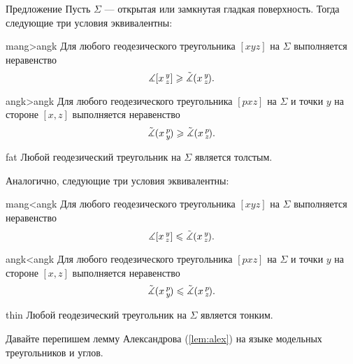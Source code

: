 \begin{thm}{Предложение}\label{prop:comp-reformulations}
Пусть $\Sigma$ --- открытая или замкнутая гладкая поверхность.
Тогда следующие три условия эквивалентны:

\begin{subthm}{mang>angk}
Для любого геодезического треугольника $[xyz]$ на $\Sigma$ выполняется неравенство
 \[\measuredangle[x\,{}^{y}_{z}]\geqslant\tilde\measuredangle(x\,{}^{y}_{z}\hspace{-0.2ex}).\]
\end{subthm}

\begin{subthm}{angk>angk}
Для любого геодезического треугольника $[pxz]$ на $\Sigma$ и точки $y$ на стороне $[x,z]$ выполняется неравенство
 \[\tilde\measuredangle(x\,{}^{p}_{y}\hspace{-0.2ex}) \geqslant \tilde\measuredangle(x\,{}^{p}_{z}\hspace{-0.2ex}).\]
 
\end{subthm}

\begin{subthm}{fat}
Любой геодезический треугольник на $\Sigma$ является толстым.
\end{subthm}

\medskip

Аналогично, следующие три условия эквивалентны:

\begin{subthmA}{mang<angk}
Для любого геодезического треугольника $[xyz]$ на $\Sigma$ выполняется неравенство
 \[\measuredangle[x\,{}^{y}_{z}]\leqslant\tilde\measuredangle(x\,{}^{y}_{z}\hspace{-0.2ex}).\]
\end{subthmA}

\begin{subthmA}{angk<angk}
Для любого геодезического треугольника $[pxz]$ на $\Sigma$ и точки $y$ на стороне $[x,z]$ выполняется неравенство
 \[\tilde\measuredangle(x\,{}^{p}_{y}\hspace{-0.2ex}) \leqslant \tilde\measuredangle(x\,{}^{p}_{z}\hspace{-0.2ex}).\]
\end{subthmA}

\begin{subthmA}{thin}
Любой геодезический треугольник на $\Sigma$ является тонким.
\end{subthmA}

\end{thm}

Давайте перепишем лемму Александрова (\ref{lem:alex}) на языке модельных треугольников и углов.

